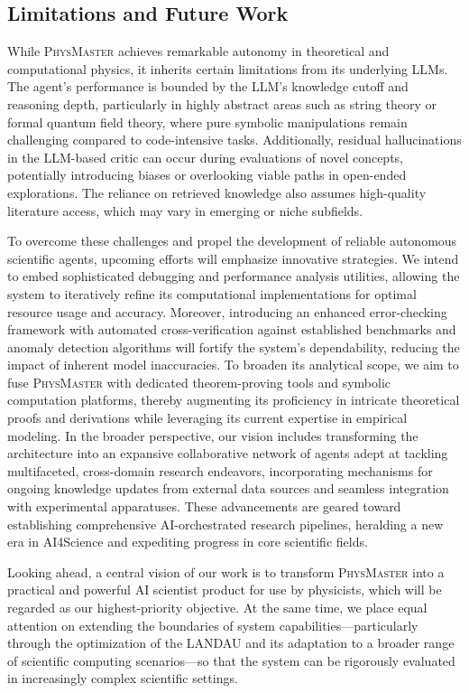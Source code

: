 \documentclass[11pt, a4paper, logo, copyright, nonumbering]{SAI}
\newcommand{\agent}{\textsc{PhysMaster}\xspace}
\newcommand{\knowledge}{\textsc{LANDAU}\xspace}
\begin{document}
\subsection{Limitations and Future Work}
\label{sec:dis-limitation}
While \agent achieves remarkable autonomy in theoretical and computational physics, it inherits certain limitations from its underlying LLMs. The agent's performance is bounded by the LLM's knowledge cutoff and reasoning depth, particularly in highly abstract areas such as string theory or formal quantum field theory, where pure symbolic manipulations remain challenging compared to code-intensive tasks. Additionally, residual hallucinations in the LLM-based critic can occur during evaluations of novel concepts, potentially introducing biases or overlooking viable paths in open-ended explorations. The reliance on retrieved knowledge also assumes high-quality literature access, which may vary in emerging or niche subfields.

To overcome these challenges and propel the development of reliable autonomous scientific agents, upcoming efforts will emphasize innovative strategies. We intend to embed sophisticated debugging and performance analysis utilities, allowing the system to iteratively refine its computational implementations for optimal resource usage and accuracy. Moreover, introducing an enhanced error-checking framework with automated cross-verification against established benchmarks and anomaly detection algorithms will fortify the system's dependability, reducing the impact of inherent model inaccuracies. To broaden its analytical scope, we aim to fuse \agent with dedicated theorem-proving tools and symbolic computation platforms, thereby augmenting its proficiency in intricate theoretical proofs and derivations while leveraging its current expertise in empirical modeling. In the broader perspective, our vision includes transforming the architecture into an expansive collaborative network of agents adept at tackling multifaceted, cross-domain research endeavors, incorporating mechanisms for ongoing knowledge updates from external data sources and seamless integration with experimental apparatuses. These advancements are geared toward establishing comprehensive AI-orchestrated research pipelines, heralding a new era in AI4Science and expediting progress in core scientific fields.

Looking ahead, a central vision of our work is to transform \textsc{PhysMaster} into a practical and powerful AI scientist product for use by physicists, which will be regarded as our highest-priority objective. At the same time, we place equal attention on extending the boundaries of system capabilities—particularly through the optimization of the \knowledge and its adaptation to a broader range of scientific computing scenarios—so that the system can be rigorously evaluated in increasingly complex scientific settings.

\newpage

\end{document}
